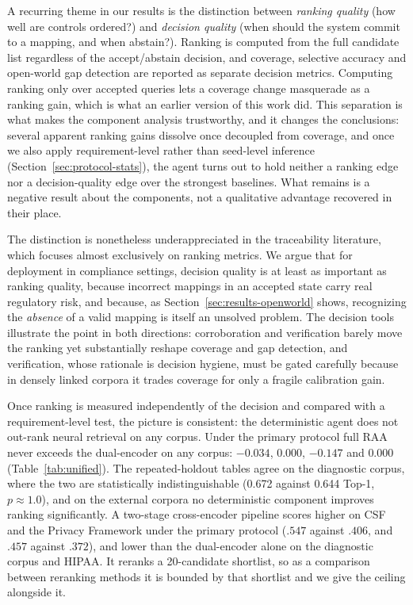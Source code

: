 \documentclass[a4paper,fleqn]{cas-sc}
\begin{document}
A recurring theme in our results is the distinction between \emph{ranking quality} (how well are controls ordered?) and \emph{decision quality} (when should the system commit to a mapping, and when abstain?).
Ranking is computed from the full candidate list regardless of the accept/abstain decision, and coverage, selective accuracy and open-world gap detection are reported as separate decision metrics. Computing ranking only over accepted queries lets a coverage change masquerade as a ranking gain, which is what an earlier version of this work did.
This separation is what makes the component analysis trustworthy, and it changes the conclusions: several apparent ranking gains dissolve once decoupled from coverage, and once we also apply requirement-level rather than seed-level inference (Section~\ref{sec:protocol-stats}), the agent turns out to hold neither a ranking edge nor a decision-quality edge over the strongest baselines. What remains is a negative result about the components, not a qualitative advantage recovered in their place.

The distinction is nonetheless underappreciated in the traceability literature, which focuses almost exclusively on ranking metrics.
We argue that for deployment in compliance settings, decision quality is at least as important as ranking quality, because incorrect mappings in an accepted state carry real regulatory risk, and because, as Section~\ref{sec:results-openworld} shows, recognizing the \emph{absence} of a valid mapping is itself an unsolved problem.
The decision tools illustrate the point in both directions: corroboration and verification barely move the ranking yet substantially reshape coverage and gap detection, and verification, whose rationale is decision hygiene, must be gated carefully because in densely linked corpora it trades coverage for only a fragile calibration gain.

Once ranking is measured independently of the decision and compared with a requirement-level test, the picture is consistent: the deterministic agent does not out-rank neural retrieval on any corpus.
Under the primary protocol full RAA never exceeds the dual-encoder on any corpus: $-0.034$, $0.000$, $-0.147$ and $0.000$ (Table~\ref{tab:unified}). The repeated-holdout tables agree on the diagnostic corpus, where the two are statistically indistinguishable (0.672 against 0.644 Top-1, $p\approx1.0$), and on the external corpora no deterministic component improves ranking significantly.
A two-stage cross-encoder pipeline scores higher on CSF and the Privacy Framework under the primary protocol ($.547$ against $.406$, and $.457$ against $.372$), and lower than the dual-encoder alone on the diagnostic corpus and HIPAA. It reranks a 20-candidate shortlist, so as a comparison between reranking methods it is bounded by that shortlist and we give the ceiling alongside it.
\end{document}
